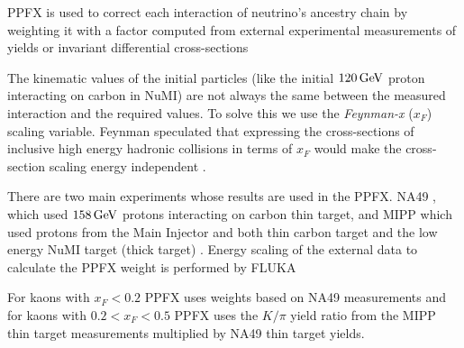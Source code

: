 PPFX is used to correct each interaction of neutrino's ancestry chain by weighting it with a factor computed from external experimental measurements of yields or invariant differential cross-sections \cite{LEOFluxPredictionAtNuMI.pdf}

The kinematic values of the initial particles (like the initial $\unit[120]{GeV}$ proton interacting on carbon in NuMI) are not always the same between the measured interaction and the required values. To solve this we use the \textit{Feynman-x} ($x_{F}$) scaling variable. Feynman speculated \cite{feynman1969.pdf} that expressing the cross-sections of inclusive high energy hadronic collisions in terms of $x_{F}$ would make the cross-section scaling energy independent \cite{LEOFluxPredictionAtNuMI.pdf}.

There are two main experiments whose results are used in the PPFX. NA49 \cite{NA49:Inclusive_production_of_charged_pions.pdf}, which used $\unit[158]{GeV}$ protons interacting on carbon thin target, and MIPP \cite{pionToKaonIn_pC.pdf} which used protons from the Main Injector and both thin carbon target and the low energy NuMI target (thick target) \cite{PPFXTechnote2017.pdf}. Energy scaling of the external data to calculate the PPFX weight is performed by FLUKA\cite{NuMIFlux.pdf}


For kaons with $x_{F}<0.2$ PPFX uses weights based on NA49 measurements\cite{NA49DataKaons.pdf} and for kaons with $0.2<x_{F}<0.5$ PPFX uses the $K/\pi$ yield ratio from the MIPP thin target measurements\cite{pionToKaonIn_pC.pdf} multiplied by NA49 thin target yields.
\fi

